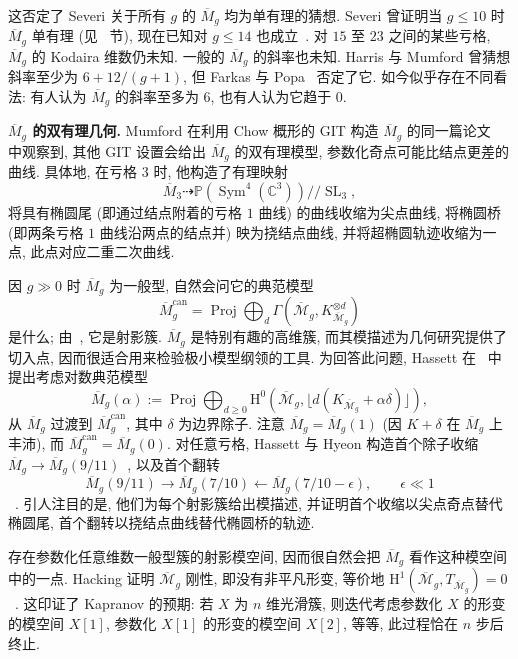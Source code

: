 这否定了 Severi 关于所有 $g$ 的 $\overline M_g$ 均为单有理的猜想. Severi 曾证明当 $g\leq10$ 时 $\overline M_g$ 单有理 (见~ 节), 现在已知对 $g\leq14$ 也成立~\cite{Ver05}. 对 $15$ 至 $23$ 之间的某些亏格, $\overline M_g$ 的 Kodaira 维数仍未知. 一般的 $\overline M_g$ 的斜率也未知. Harris 与 Mumford 曾猜想斜率至少为 $6+12/(g+1)$, 但 Farkas 与 Popa~\cite{FP05} 否定了它. 如今似乎存在不同看法: 有人认为 $\overline M_g$ 的斜率至多为 $6$, 也有人认为它趋于 $0$.

\noindent\textbf{$\overline M_g$ 的双有理几何.} Mumford 在利用 Chow 概形的 GIT 构造 $\overline M_g$ 的同一篇论文~\cite{Mum77} 中观察到, 其他 GIT 设置会给出 $\overline M_g$ 的双有理模型, 参数化奇点可能比结点更差的曲线. 具体地, 在亏格 $3$ 时, 他构造了有理映射
\[
\overline M_3\dashrightarrow\mathbb P(\operatorname{Sym}^4(\mathbb C^3))\mathbin{/\!/}\operatorname{SL}_3,
\]
将具有椭圆尾 (即通过结点附着的亏格 $1$ 曲线) 的曲线收缩为尖点曲线, 将椭圆桥 (即两条亏格 $1$ 曲线沿两点的结点并) 映为挠结点曲线, 并将超椭圆轨迹收缩为一点, 此点对应二重二次曲线.

因 $g\gg0$ 时 $\overline M_g$ 为一般型, 自然会问它的典范模型
\[
\overline M_g^{\mathrm{can}}=\operatorname{Proj}\bigoplus_d\Gamma(\overline{\mathcal M}_g,K_{\overline{\mathcal M}_g}^{\otimes d})
\]
是什么; 由~\cite{BCHM10}, 它是射影簇. $\overline M_g$ 是特别有趣的高维簇, 而其模描述为几何研究提供了切入点, 因而很适合用来检验极小模型纲领的工具. 为回答此问题, Hassett 在~\cite{Has05} 中提出考虑对数典范模型
\begin{equation}\label{src:6.10.13}
\overline M_g(\alpha):=\operatorname{Proj}\bigoplus_{d\geq0}\mathrm H^0(\overline{\mathcal M}_g,\lfloor d(K_{\overline{\mathcal M}_g}+\alpha\delta)\rfloor),
\end{equation}
从 $\overline M_g$ 过渡到 $\overline M_g^{\mathrm{can}}$, 其中 $\delta$ 为边界除子. 注意 $\overline M_g=\overline M_g(1)$ (因 $K+\delta$ 在 $\overline M_g$ 上丰沛), 而 $\overline M_g^{\mathrm{can}}=\overline M_g(0)$. 对任意亏格, Hassett 与 Hyeon 构造首个除子收缩 $\overline M_g\to\overline M_g(9/11)$~\cite{HH09}, 以及首个翻转
\[
\overline M_g(9/11)\longrightarrow\overline M_g(7/10)\longleftarrow\overline M_g(7/10-\epsilon),\qquad\epsilon\ll1
\]
~\cite{HH13}. 引人注目的是, 他们为每个射影簇给出模描述, 并证明首个收缩以尖点奇点替代椭圆尾, 首个翻转以挠结点曲线替代椭圆桥的轨迹.

存在参数化任意维数一般型簇的射影模空间, 因而很自然会把 $\overline M_g$ 看作这种模空间中的一点. Hacking 证明 $\overline{\mathcal M}_g$ 刚性, 即没有非平凡形变, 等价地 $\mathrm H^1(\overline{\mathcal M}_g,\allowbreak T_{\overline{\mathcal M}_g})=0$~\cite{Hac08}. 这印证了 Kapranov 的预期: 若 $X$ 为 $n$ 维光滑簇, 则迭代考虑参数化 $X$ 的形变的模空间 $X[1]$, 参数化 $X[1]$ 的形变的模空间 $X[2]$, 等等, 此过程恰在 $n$ 步后终止.

